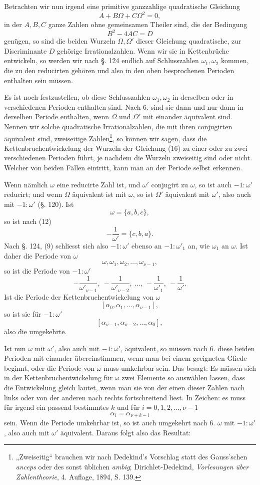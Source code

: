 \documentclass[11pt]{article}
\begin{document}
Betrachten wir nun irgend eine primitive ganzzahlige quadratische Gleichung
\[
\tag{16}       A+B\Omega+C\Omega^2=0,
\]
in der $A,B,C$ ganze Zahlen ohne gemeinsamen Theiler sind, die der Bedingung
\[
        B^2-4AC=D
\]
genügen, so sind die beiden Wurzeln $\Omega,\Omega'$ dieser Gleichung quadratische, zur Discriminante $D$ gehörige Irrationalzahlen. Wenn wir sie in Kettenbrüche entwickeln, so werden wir nach §. 124 endlich auf Schlusszahlen $\omega_1,\omega_2$ kommen, die zu den reducirten gehören und also in den oben besprochenen Perioden enthalten sein müssen.

Es ist noch festzustellen, ob diese Schlusszahlen $\omega_1,\omega_2$ in derselben oder in verschiedenen Perioden enthalten sind. Nach 6. sind sie dann und nur dann in derselben Periode enthalten, wenn $\Omega$ und $\Omega'$ mit einander äquivalent sind. Nennen wir solche quadratische Irrationalzahlen, die mit ihren conjugirten äquivalent sind, zweiseitige Zahlen\footnote{„Zweiseitig“ brauchen wir nach Dedekind's Vorschlag statt des Gauss'schen \emph{anceps} oder des sonst üblichen \emph{ambig}; Dirichlet-Dedekind, \emph{Vorlesungen über Zahlentheorie}, 4. Auflage, 1894, S. 139.}, so können wir sagen, dass die Kettenbruchentwickelung der Wurzeln der Gleichung (16) zu einer oder zu zwei verschiedenen Perioden führt, je nachdem die Wurzeln zweiseitig sind oder nicht. Welcher von beiden Fällen eintritt, kann man an der Periode selbst erkennen.

Wenn nämlich $\omega$ eine reducirte Zahl ist, und $\omega'$ conjugirt zu $\omega$, so ist auch $-1:\omega'$ reducirt; und wenn $\Omega$ äquivalent ist mit $\omega$, so ist $\Omega'$ äquivalent mit $\omega'$, also auch mit $-1:\omega'$ (§. 120). Ist
\[
        \omega=\{a,b,c\},
\]
so ist nach (12)
\[
        -\frac1{\omega'}=\{c,b,a\}.
\]
Nach §. 124, (9) schliesst sich also $-1:\omega'$ ebenso an $-1:\omega'_1$ an, wie $\omega_1$ an $\omega$. Ist daher die Periode von $\omega$
\[
        \omega,\omega_1,\omega_2,\ldots,\omega_{\nu-1},
\]
so ist die Periode von $-1:\omega'$
\[
        -\frac1{\omega'_{\nu-1}},\ -\frac1{\omega'_{\nu-2}},\ \ldots,\ -\frac1{\omega'_1},\ -\frac1{\omega'}.
\]
Ist die Periode der Kettenbruchentwickelung von $\omega$
\[
\tag{17}       [\alpha_0,\alpha_1,\ldots,\alpha_{\nu-1}],
\]
so ist sie für $-1:\omega'$
\[
\tag{18}       [\alpha_{\nu-1},\alpha_{\nu-2},\ldots,\alpha_0],
\]
also die umgekehrte.

Ist nun $\omega$ mit $\omega'$, also auch mit $-1:\omega'$, äquivalent, so müssen nach 6. diese beiden Perioden mit einander übereinstimmen, wenn man bei einem geeigneten Gliede beginnt, oder die Periode von $\omega$ muss umkehrbar sein. Das besagt: Es müssen sich in der Kettenbruchentwickelung für $\omega$ zwei Elemente so auswählen lassen, dass die Entwickelung gleich lautet, wenn man sie von der einen dieser Zahlen nach links oder von der anderen nach rechts fortschreitend liest. In Zeichen: es muss für irgend ein passend bestimmtes $k$ und für $i=0,1,2,\ldots,\nu-1$
\[
        \alpha_i=\alpha_{\nu+k-i}
\]
sein. Wenn die Periode umkehrbar ist, so ist auch umgekehrt nach 6. $\omega$ mit $-1:\omega'$, also auch mit $\omega'$ äquivalent. Daraus folgt also das Resultat:
\end{document}
